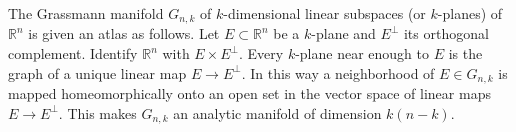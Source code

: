 The Grassmann manifold $G_{n,k}$ of $k$-dimensional linear subspaces (or $k$-planes) of $\mathbb{R}^n$ is given an atlas as follows. Let $E \subset \mathbb{R}^n$ be a $k$-plane and $E^\perp$ its orthogonal complement. Identify $\mathbb{R}^n$ with $E \times E^\perp$. Every $k$-plane near enough to $E$ is the graph of a unique linear map $E \to E^\perp$. In this way a neighborhood of $E \in G_{n,k}$ is mapped homeomorphically onto an open set in the vector space of linear maps $E \to E^\perp$. This makes $G_{n,k}$ an analytic manifold of dimension $k(n-k)$.
